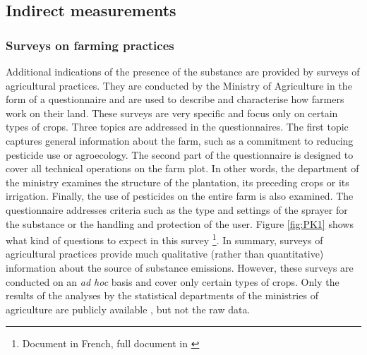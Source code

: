 
\subsection{Indirect measurements}

\subsubsection{Surveys on farming practices}

Additional indications of the presence of the substance are provided by surveys of agricultural practices. They are conducted by the Ministry of Agriculture in the form of a questionnaire and are used to describe and characterise how farmers work on their land. These surveys are very specific and focus only on certain types of crops. Three topics are addressed in the questionnaires. The first topic captures general information about the farm, such as a commitment to reducing pesticide use or agroecology. The second part of the questionnaire is designed to cover all technical operations on the farm plot. In other words, the department of the ministry examines the structure of the plantation, its preceding crops or its irrigation. Finally, the use of pesticides on the entire farm is also examined. The questionnaire addresses criteria such as the type and settings of the sprayer for the substance or the handling and protection of the user.
Figure \ref{fig:PK1} shows what kind of questions to expect in this survey \footnote{Document in French, full document in \cite{PK}}. In summary, surveys of agricultural practices provide much qualitative (rather than quantitative) information about the source of substance emissions. However, these surveys are conducted on an \textit{ad hoc} basis and cover only certain types of crops. Only the results of the analyses by the statistical departments of the ministries of agriculture are publicly available \citep{PK2}, but not the raw data.

